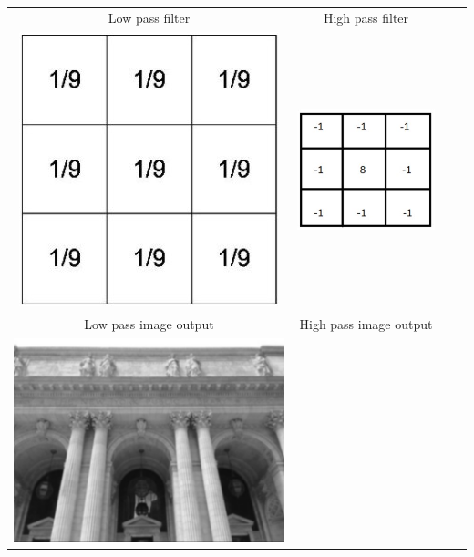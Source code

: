\paragraph{}
\begin{table}[h!]
     \begin{center}
     \begin{tabular}{c c c c}
      Low pass filter & High pass filter \\ 
     \includegraphics[scale=0.7]{lpf.jpg}
      & 
      \includegraphics[scale=0.7]{hpf.jpg}\\
      Low pass image output & High pass image output \\ 
      \includegraphics[scale=0.4]{lpres.jpg}

\end{tabular}
\end{center}
\end{table}
